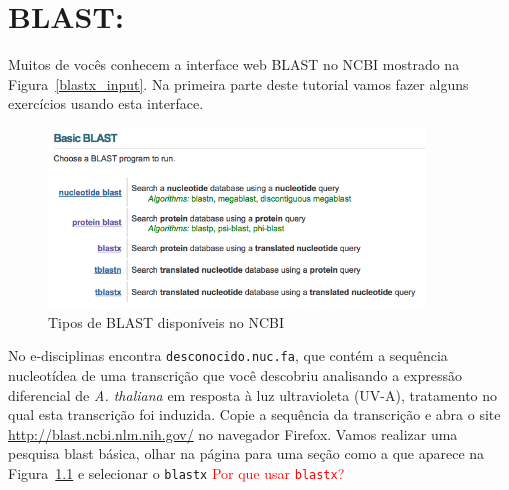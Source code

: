 \documentclass[letter,11pt]{book}
\begin{document}
%
%
%
%
%

\chapter{BLAST: }

Muitos de vocês conhecem a interface web BLAST no NCBI mostrado na Figura~\ref{blastx_input}.  Na primeira parte deste tutorial vamos fazer alguns exercícios usando esta interface.

\begin{figure}[h!]
\centering
   \includegraphics[width=10cm]{Figs/blasthomepage.png}
  \caption{\label{blasthomepage}Tipos de BLAST disponíveis no NCBI}
\end{figure}

No e-disciplinas encontra \Verb+desconocido.nuc.fa+, que contém a sequência nucleotídea de uma transcrição que você descobriu analisando a expressão diferencial de \textit{A. thaliana} em resposta à luz ultravioleta (UV-A), tratamento no qual esta transcrição foi induzida. Copie a sequência da transcrição e abra o site \url{http://blast.ncbi.nlm.nih.gov/} no navegador Firefox. Vamos realizar uma pesquisa blast básica, olhar na página para uma seção como a que aparece na Figura~\ref{blasthomepage} e selecionar o \Verb+blastx+\textcolor{red}{{\textquestiondown} Por que usar \Verb+blastx+?}
\end{document}
